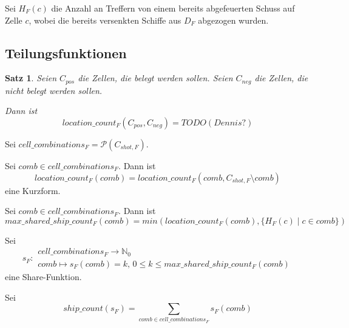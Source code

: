 \documentclass[a4paper,12pt]{llncs}
\newcommand{\N}{{\mathbb{N}}}
\numberwithin{equation}{section}
\newtheorem{satz}{Satz}
\begin{document}
\begin{definition}
Sei $H_F(c)$ die Anzahl an Treffern von einem bereits abgefeuerten Schuss auf Zelle $c$, wobei die bereits versenkten Schiffe aus $D_F$ abgezogen wurden.
\end{definition}

\subsection{Teilungsfunktionen}

\begin{satz}
Seien $C_{pos}$ die Zellen, die belegt werden sollen. Seien $C_{neg}$ die Zellen, die nicht belegt werden sollen.

Dann ist
\[
location\_count_F(C_{pos}, C_{neg})=TODO (Dennis?)
\]
\end{satz}

\begin{definition}
Sei $cell\_combinations_F=\mathcal{P}(C_{shot,F})$.
\end{definition}

\begin{definition}
Sei $comb \in cell\_combinations_F$. Dann ist
\[
location\_count_F(comb)=location\_count_F(comb, C_{shot,F} \setminus comb)
\]
eine Kurzform.
\end{definition}

\begin{definition}
Sei $comb \in cell\_combinations_F$. Dann ist
\[
max\_shared\_ship\_count_F(comb)=min(location\_count_F(comb), \{H_F(c) \mid c \in comb\})
\]
\end{definition}

\begin{definition}
Sei
\[
s_F \colon \begin{array}{l} 
          cell\_combinations_F \rightarrow \N_0 \\ 
          comb\mapsto s_F(comb)=k, \, 0 \leq k \leq max\_shared\_ship\_count_F(comb)
         \end{array}
\]
eine Share-Funktion.
\end{definition}

\begin{definition}
Sei
\[
ship\_count(s_F)=\sum_{comb \in cell\_combinations_F}{s_F(comb)}
\]
\end{definition}
\end{document}
